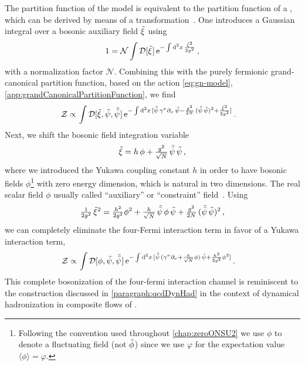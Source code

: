 The partition function of the \gn{} model is equivalent to the partition function of a \bgn{}, which can be derived by means of a  transformation~\cite{Stratonovich:1957,Hubbard:1959ub}.
One introduces a Gaussian integral over a bosonic auxiliary field $\tilde{\xi}$ using
\begin{align}
	1 = \mathcal{N} \int \mathcal{D}[ \FSff{\xi} \vts] \, \eu^{- \int \dif^{\,2}\! x \, \frac{\FSff{\xi}^2}{2g^2}} \, ,\label{eq:gnHStrafo}
\end{align}
with a normalization factor $\mathcal{N}$.
Combining this with the purely fermionic grand-canonical partition function, based on the action \eqref{eq:gn-model}, \cf{} \cref{app:grandCanonicalPartitionFunction}, we find
\begin{align}
	\mathcal{Z} \propto \, &  \int \mathcal{D}[ \FSff{\xi},\Fpsi,\Fpsib\vts]  \, \eu^{- \int \dif^{\, 2}\! x \, [ \Fpsib \, \gamma^\nu\partial_\nu \, \Fpsi - \frac{g^2}{2 N} \, ( \Fpsib \, \Fpsi )^2 + \frac{\FSff{\xi}^2}{2g^2} ]} \, .
\end{align}
Next, we shift the bosonic field integration variable
\begin{align}
	\tilde{\xi} = h \, \phi + \tfrac{g^2}{\sqrt{N}} \, \tilde{\bar{\psi}} \, \tilde{\psi} \, ,
\end{align}
where we introduced the Yukawa coupling constant $h$ in order to have bosonic fields $\phi$\footnote{Following the convention used throughout \cref{chap:zeroONSU2} we use $\phi$ to denote a fluctuating field (not $\tilde{\phi}$) since we use $\varphi$ for the expectation value $\langle \phi\rangle=\varphi$.} with zero energy dimension, which is natural in two dimensions.
The real scalar field $\phi$ usually called ``auxiliary'' or ``constraint'' field~\cite{Harrington:1974tf,Jacobs:1974ys,Luperini:1991sv,Braun:2011pp}.
Using
\begin{align}
	\tfrac{1}{2 g^2} \, \tilde{\xi}^2 = \tfrac{h^2}{2 g^2} \phi^2 + \tfrac{h}{\sqrt{N}} \, \tilde{\bar{\psi}} \, \phi \, \tilde{\psi} + \tfrac{g^2}{2 N} \, ( \tilde{\bar{\psi}} \, \tilde{\psi} )^2 \, ,
\end{align}
we can completely eliminate the four-Fermi interaction term in favor of a Yukawa interaction term,
\begin{align}
	\mathcal{Z} \propto \, &  \int \mathcal{D}[\phi, \Fpsi,\Fpsib\vts] \, \eu^{- \int \dif^{\, 2}\! x \, [ \Fpsib \, ( \gamma^\nu\partial_\nu + \frac{h}{\sqrt{N}} \phi ) \, \Fpsi + \frac{h^2}{2 g^2} \phi^2 ]} \, .\label{eq:Zbgn}
\end{align}
This complete bosonization of the four-fermi interaction channel is reminiscent to the construction discussed in \cref{paragraph:qcdDynHad} in the context of dynamical hadronization in composite \frg{} flows of \qcd{}.
	
